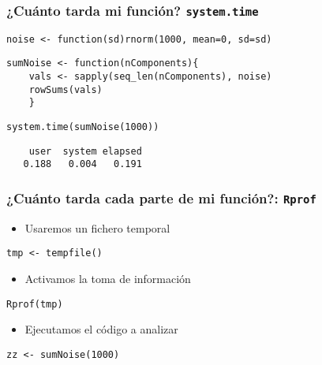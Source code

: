 \documentclass[xcolor={usenames,svgnames,dvipsnames}]{beamer}
\begin{document}
\begin{frame}[fragile]
\frametitle{¿Cuánto tarda mi función? \texttt{system.time}}
\label{sec-3-5}



\lstset{language=R}
\begin{lstlisting}
noise <- function(sd)rnorm(1000, mean=0, sd=sd)
\end{lstlisting}



\lstset{language=R}
\begin{lstlisting}
sumNoise <- function(nComponents){
    vals <- sapply(seq_len(nComponents), noise)
    rowSums(vals)
    }
\end{lstlisting}



\lstset{language=R}
\begin{lstlisting}
system.time(sumNoise(1000))
\end{lstlisting}

\begin{verbatim}
    user  system elapsed 
   0.188   0.004   0.191
\end{verbatim}
\end{frame}
\begin{frame}[fragile]
\frametitle{¿Cuánto tarda cada parte de mi función?: \texttt{Rprof}}
\label{sec-3-6}

\begin{itemize}
\item Usaremos un fichero temporal
\end{itemize}

\lstset{language=R}
\begin{lstlisting}
tmp <- tempfile()
\end{lstlisting}


\begin{itemize}
\item Activamos la toma de información
\end{itemize}

\lstset{language=R}
\begin{lstlisting}
Rprof(tmp)
\end{lstlisting}


\begin{itemize}
\item Ejecutamos el código a analizar
\end{itemize}

\lstset{language=R}
\begin{lstlisting}
zz <- sumNoise(1000)
\end{lstlisting}


   
\end{frame}
\end{document}
